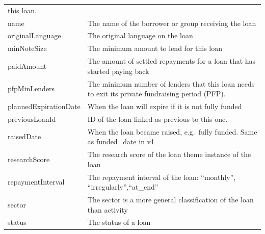 \begin{longtable}{|p{}|p{}|}
    this loan.                                                                                               \\
    name                                 & The name of the borrower or group receiving the loan              \\
    originalLanguage                     & The original language on the loan                                 \\
    minNoteSize                          & The minimum amount to lend for this loan                          \\
    paidAmount                           & The amount of settled repayments for a loan that has
    started paying back                                                                                      \\
    pfpMinLenders                        & The minimum number of lenders that this loan needs to
    exit its private fundraising period (PFP).                                                               \\
    plannedExpirationDate                & When the loan will expire if it is not fully
    funded                                                                                                   \\
    previousLoanId                       & ID of the loan linked as previous to this one.                    \\
    raisedDate                           & When the loan became raised, e.g.~fully funded. Same as
    funded\_date in v1                                                                                       \\
    researchScore                        & The research score of the loan theme instance of the
    loan                                                                                                     \\
    repaymentInterval                    & The repayment interval of the loan: ``monthly'',
    ``irregularly'',``at\_end''                                                                              \\
    sector                               & The sector is a more general classification of the loan than
    activity                                                                                                 \\
    status                               & The status of a loan                                              \\

\end{longtable}
